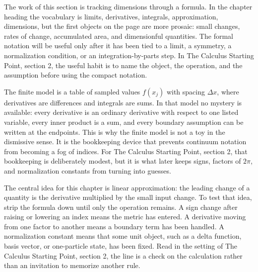 











The work of this section is tracking dimensions through a formula.  In the chapter heading the vocabulary is limits, derivatives, integrals, approximation, dimensions, but the first objects on the page are more prosaic: small changes, rates of change, accumulated area, and dimensionful quantities.  The formal notation will be useful only after it has been tied to a limit, a symmetry, a normalization condition, or an integration-by-parts step.  In The Calculus Starting Point, section 2, the useful habit is to name the object, the operation, and the assumption before using the compact notation.

The finite model is a table of sampled values \(f(x_j)\) with spacing \(\Delta x\), where derivatives are differences and integrals are sums.  In that model no mystery is available: every derivative is an ordinary derivative with respect to one listed variable, every inner product is a sum, and every boundary assumption can be written at the endpoints.  This is why the finite model is not a toy in the dismissive sense.  It is the bookkeeping device that prevents continuum notation from becoming a fog of indices.  For The Calculus Starting Point, section 2, that bookkeeping is deliberately modest, but it is what later keeps signs, factors of \(2\pi\), and normalization constants from turning into guesses.

The central idea for this chapter is linear approximation: the leading change of a quantity is the derivative multiplied by the small input change.  To test that idea, strip the formula down until only the operation remains.  A sign change after raising or lowering an index means the metric has entered.  A derivative moving from one factor to another means a boundary term has been handled.  A normalization constant means that some unit object, such as a delta function, basis vector, or one-particle state, has been fixed.  Read in the setting of The Calculus Starting Point, section 2, the line is a check on the calculation rather than an invitation to memorize another rule.


